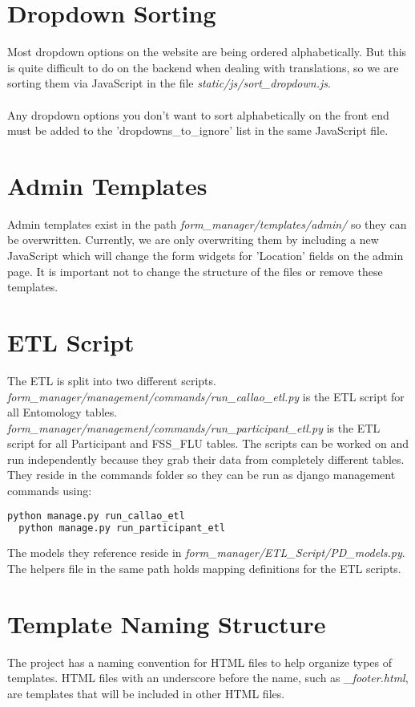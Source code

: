 \documentclass{article}
\begin{document}
\section{Dropdown Sorting}
Most dropdown options on the website are being ordered alphabetically. But this is quite difficult to do on the backend when dealing with translations, so we are sorting them via JavaScript in the file \textit{static/js/sort\_dropdown.js}.
\\\\Any dropdown options you don't want to sort alphabetically on the front end must be added to the 'dropdowns\_to\_ignore' list in the same JavaScript file.

\section{Admin Templates}
Admin templates exist in the path \textit{form\_manager/templates/admin/} so they can be overwritten. Currently, we are only overwriting them by including a new JavaScript which will change the form widgets for 'Location' fields on the admin page. It is important not to change the structure of the files or remove these templates.

\section{ETL Script}
The ETL is split into two different scripts.
\\\textit{form\_manager/management/commands/run\_callao\_etl.py} is the ETL script for all Entomology tables.  \\\textit{form\_manager/management/commands/run\_participant\_etl.py} is the ETL script for all Participant and FSS\_FLU tables. The scripts can be worked on and run independently because they grab their data from completely different tables. They reside in the commands folder so they can be run as django management commands using:
\begin{lstlisting}[language=bash]
  python manage.py run_callao_etl
  python manage.py run_participant_etl
\end{lstlisting}
The models they reference reside in \textit{form\_manager/ETL\_Script/PD\_models.py}.  The helpers file in the same path holds mapping definitions for the ETL scripts.

\section{Template Naming Structure}
The project has a naming convention for HTML files to help organize types of templates.  HTML files with an underscore before the name, such as \textit{\_footer.html}, are templates that will be included in other HTML files.
\end{document}
